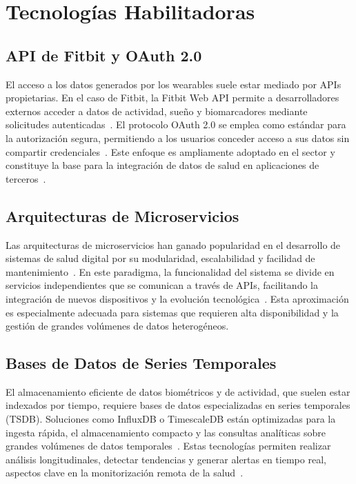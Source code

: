 \section{Tecnologías Habilitadoras}

\subsection{API de Fitbit y OAuth 2.0}

El acceso a los datos generados por los wearables suele estar mediado por APIs propietarias. En el caso de Fitbit, la Fitbit Web API permite a desarrolladores externos acceder a datos de actividad, sueño y biomarcadores mediante solicitudes autenticadas~\cite{FitbitAPI}. El protocolo OAuth 2.0 se emplea como estándar para la autorización segura, permitiendo a los usuarios conceder acceso a sus datos sin compartir credenciales~\cite{Hardt2012}. Este enfoque es ampliamente adoptado en el sector y constituye la base para la integración de datos de salud en aplicaciones de terceros~\cite{Roehrs2017}.

\subsection{Arquitecturas de Microservicios}

Las arquitecturas de microservicios han ganado popularidad en el desarrollo de sistemas de salud digital por su modularidad, escalabilidad y facilidad de mantenimiento~\cite{Dragoni2017}. En este paradigma, la funcionalidad del sistema se divide en servicios independientes que se comunican a través de APIs, facilitando la integración de nuevos dispositivos y la evolución tecnológica~\cite{Newman2015}. Esta aproximación es especialmente adecuada para sistemas que requieren alta disponibilidad y la gestión de grandes volúmenes de datos heterogéneos.

\subsection{Bases de Datos de Series Temporales}

El almacenamiento eficiente de datos biométricos y de actividad, que suelen estar indexados por tiempo, requiere bases de datos especializadas en series temporales (TSDB). Soluciones como InfluxDB o TimescaleDB están optimizadas para la ingesta rápida, el almacenamiento compacto y las consultas analíticas sobre grandes volúmenes de datos temporales~\cite{InfluxDB, TimescaleDB}. Estas tecnologías permiten realizar análisis longitudinales, detectar tendencias y generar alertas en tiempo real, aspectos clave en la monitorización remota de la salud~\cite{Roehrs2017}.

